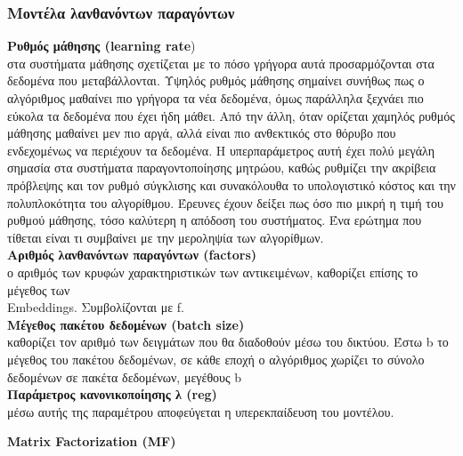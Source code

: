 \subsubsection{Μοντέλα λανθανόντων παραγόντων}
\begin{tcolorbox}[
	colframe=blue!25,
	colback=blue!10,
	coltitle=blue!20!black,  
	fonttitle=\bfseries,
	adjusted title= Υπερπαράμετροι (κοινοί σε όλους τους αλγορίθμους εκτός του SLIM)]


\textbf{Ρυθμός μάθησης (learning rate})\\ στα συστήματα μάθησης σχετίζεται με το πόσο γρήγορα αυτά προσαρμόζονται στα δεδομένα που μεταβάλλονται. Υψηλός ρυθμός μάθησης σημαίνει συνήθως πως ο αλγόριθμος μαθαίνει πιο γρήγορα τα νέα δεδομένα, όμως παράλληλα ξεχνάει πιο εύκολα τα δεδομένα που έχει ήδη μάθει. Από την άλλη, όταν ορίζεται χαμηλός ρυθμός μάθησης μαθαίνει μεν πιο αργά, αλλά είναι πιο ανθεκτικός στο θόρυβο που ενδεχομένως να περιέχουν τα δεδομένα. Η υπερπαράμετρος αυτή έχει πολύ μεγάλη σημασία στα συστήματα παραγοντοποίησης μητρώου, καθώς ρυθμίζει την ακρίβεια πρόβλεψης και τον ρυθμό σύγκλισης και συνακόλουθα το υπολογιστικό κόστος και την πολυπλοκότητα του αλγορίθμου. Έρευνες έχουν δείξει πως όσο πιο μικρή η τιμή του ρυθμού μάθησης, τόσο καλύτερη η απόδοση του συστήματος. Ένα ερώτημα που τίθεται είναι τι συμβαίνει με την μεροληψία των αλγορίθμων.  \\
\textbf{Αριθμός λανθανόντων παραγόντων (factors)} \\ ο αριθμός των κρυφών χαρακτηριστικών των αντικειμένων, καθορίζει επίσης το μέγεθος των \\ Embeddings. Συμβολίζονται με f.\\
\textbf{Μέγεθος πακέτου δεδομένων (batch size)} \\καθορίζει τον αριθμό των δειγμάτων που θα διαδοθούν μέσω του δικτύου. Έστω b το μέγεθος του πακέτου δεδομένων, σε κάθε εποχή ο αλγόριθμος χωρίζει το σύνολο δεδομένων σε πακέτα δεδομένων, μεγέθους b\\
\textbf{Παράμετρος κανονικοποίησης λ (reg)}\\ μέσω αυτής της παραμέτρου αποφεύγεται η υπερεκπαίδευση του μοντέλου.
\end{tcolorbox}
\noindent \textbf{Matrix Factorization (MF)}\\
